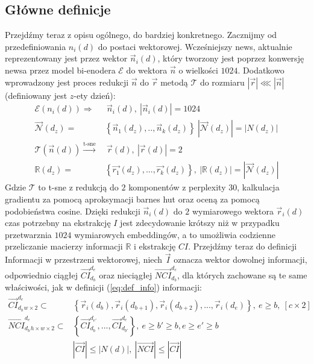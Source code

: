 \subsection{Główne definicje}

Przejdźmy teraz z opisu ogólnego, do bardziej konkretnego. Zacznijmy od przedefiniowania $n_{i}(d)$ 
do postaci wektorowej. Wcześniejszy news, aktualnie reprezentowany jest przez wektor $\vec{n}_{i}(d)$, 
który tworzony jest poprzez konwersję newsa przez model bi-enodera $\mathcal{E}$ do wektora $\vec{n}$ 
o wielkości $1024$. Dodatkowo wprowadzony jest proces redukcji $\vec{n}$ do $\vec{r}$ metodą 
$\mathcal{T}$ do rozmiaru $|\vec{r}| \lll |\vec{n}|$ (definiowany jest $z$-ety dzień):
\begin{equation} \label{eq:def_info_global_base}
    \begin{aligned}
        \mathcal{E}(n_{i}(d)) \Rightarrow & \: \vec{n}_{i}(d), \: |\vec{n}_{i}(d)| = 1024 \\
        \mathcal{\vec{N}}(d_{z}) = & \left\{ \vec{n}_{1}(d_{z}), .., \vec{n}_{k}(d_{z}) \right\} \: |\mathcal{\vec{N}}(d_{z})| = |N(d_{z})| \\
        \mathcal{T}(\vec{n}(d)) \xrightarrow[]{\text{t-sne}} & \: \vec{r}(d), \: |\vec{r}(d)|= 2 \\
        \mathbb{R}(d_{z}) = & \left\{\vec{r_{1}}(d_{z}), ..., \vec{r_{k}}(d_{z})  \right\}, \: |\mathbb{R}(d_{z})| = |\mathcal{\vec{N}}(d_{z})|
    \end{aligned}
\end{equation}
Gdzie $\mathcal{T}$ to t-sne z redukcją do $2$ komponentów z perplexity $30$, kalkulacja gradientu 
za pomocą aproksymacji barnes hut oraz oceną za pomocą podobieństwa cosine. Dzięki redukcji $\vec{n}_{i}(d)$ 
do $2$ wymiarowego wektora $\vec{r}_{i}(d)$ czas potrzebny na ekstrakcję $I$ jest zdecydowanie krótszy
niż w przypadku przetwarznia $1024$ wymiarowych embeddingów, a to umożliwia codzienne przeliczanie macierzy 
informacji $\mathbb{R}$ i ekstrakcję $CI$. Przejdźmy teraz do definicji Informacji w przestrzeni wektorowej, 
niech $\vec{I}$ oznacza wektor dowolnej informacji, odpowiednio ciągłej $\vec{CI}_{d_{b}}^{d_{e}}$ 
oraz nieciągłej $\vec{NCI}_{d_{b}}^{d_{e}}$, dla których zachowane są te same właściwości, 
jak w definicji (\ref{eq:def_info}) informacji:
\begin{equation} 
    \label{eq:def_info_global}
    \begin{aligned}
        \vec{CI}_{d_{b}}^{d_{e}}_{w \times 2} \subset & 
            \left\{ 
                \vec{r}_{i}(d_{b}), 
                \vec{r}_{i}(d_{b+1}), 
                \vec{r}_{i}(d_{b+2}), 
                ..., 
                \vec{r}_{i}(d_{e}) 
            \right\}, \: e \geq b, \: [c \times 2]
        \\
        \vec{NCI}_{d_{b}}^{d_{e}}_{h \times w \times 2} \subset & 
            \left\{ 
                \vec{CI}_{d_{b}}^{d_{e'}}, 
                ..., 
                \vec{CI}_{d_{b'}}^{d_{e}} 
            \right\}, \: e \geq b' \geq b, e \geq e' \geq b 
        \\
        & |\vec{CI}| \leq |N(d)|, \: |\vec{NCI}| \leq |\vec{CI}|
    \end{aligned}
\end{equation}
